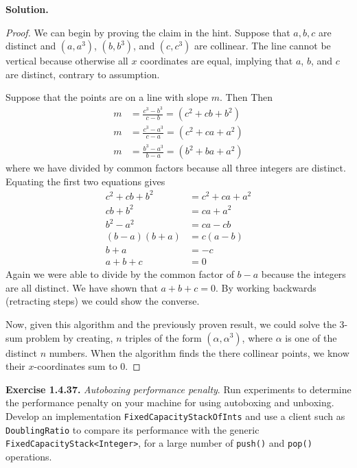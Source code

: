 \documentclass[12pt, a4paper]{article}
\newenvironment{ex}[2][Exercise]
{\par\medskip\noindent \textbf{#1 #2.}}
{\medskip}
\newenvironment{sol}[1][Solution]
{\par\medskip\noindent \textbf{#1.} }
{\medskip}
\begin{document}
	\begin{sol}
		\begin{proof}
			We can begin by proving the claim in the hint. Suppose that $a,b,c$ are distinct
			and $(a,a^3)$, $(b,b ^3)$, and $(c,c^3)$ are collinear. The line cannot be
			vertical because otherwise all $x$ coordinates are equal, implying that
			$a$, $b$, and $c$ are distinct, contrary to assumption.
			
			Suppose that the points are on a line with slope $m$. Then
			Then
			\begin{align*}
				m &= \frac{c^3-b^3}{c-b} = (c^2+cb+b^2)\\
				m &= \frac{c^3-a^3}{c-a} = (c^2+ca+a^2)\\
				m &= \frac{b^3-a^3}{b-a} = (b^2+ba+a^2)
			\end{align*}
			where we have divided by common factors because all three integers are distinct.
			Equating the first two equations gives
			\begin{align*}
				c^2+cb+b^2 &= c^2+ca+a^2\\
				cb+b^2&=ca+a^2\\
				b^2-a^2 &= ca - cb\\
				(b-a)(b+a) &= c(a-b)\\
				b+a &= -c\\
				a+b+c &= 0
			\end{align*}
			Again we were able to divide by the common factor of $b-a$ because the
			integers are all distinct. We have shown that $a+b+c=0$. By working backwards
			(retracting steps) we could show the converse.
			
			Now, given this algorithm and the previously proven result, we could solve the
			3-sum problem by creating, $n$ triples of the form $(\alpha,\alpha^3)$, where $\alpha$ is
			one of the distinct $n$ numbers. When the algorithm finds the there collinear
			points, we know their $x$-coordinates sum to $0$.
		\end{proof}
	\end{sol}
	\begin{ex}{1.4.37}
		\emph{Autoboxing performance penalty}. Run experiments to determine the performance
		penalty on your machine for using autoboxing and unboxing.  Develop an implementation
		\texttt{FixedCapacityStackOfInts} and use a client such as \texttt{DoublingRatio}
		to compare its performance with the generic \texttt{FixedCapacityStack<Integer>},
		for a large number of \texttt{push()} and \texttt{pop()} operations.
	\end{ex}
\end{document}
